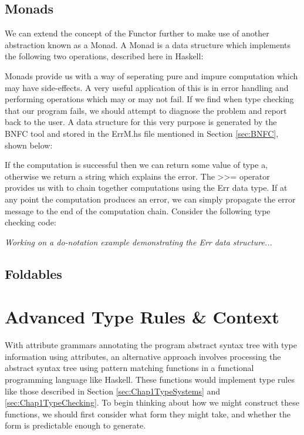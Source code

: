 \documentclass{UoYCSproject}
\begin{document}
\subsection{Monads}
We can extend the concept of the Functor further to make use of another
abstraction known as a Monad. A Monad is a data structure which implements the
following two operations, described here in Haskell:

Monads provide us with a way of seperating pure and impure computation which
may have side-effects. A very useful application of this is in error handling
and performing operations which may or may not fail. If we find when type
checking that our program fails, we should attempt to diagnose the problem and
report back to the user. A data structure for this very purpose is generated by
the BNFC tool and stored in the {\ttfamily ErrM.hs} file mentioned in Section
\ref{sec:BNFC}, shown below:

If the computation is successful then we can return some value of type
{\ttfamily a}, otherwise we return a string which explains the error. The
{\ttfamily >>=} operator provides us with to chain together computations using
the {\ttfamily Err} data type. If at any point the computation produces an
error, we can simply propagate the error message to the end of the computation
chain. Consider the following type checking code:
%

\textit{Working on a do-notation example demonstrating the Err data structure...}

\subsection{Foldables}

\cite{MilewskiCTFP}
\cite{HuttonHaskell}

\section{Advanced Type Rules \& Context}
With attribute grammars annotating the program abstract syntax tree with type
information using attributes, an alternative approach involves processing the
abstract syntax tree using pattern matching functions in a functional programming
language like Haskell. These functions would implement type rules like those
described in Section \ref{sec:Chap1TypeSystems} and \ref{sec:Chap1TypeChecking}.
To begin thinking about how we might construct these functions, we should first
consider what form they might take, and whether the form is predictable enough
to generate.
\end{document}
